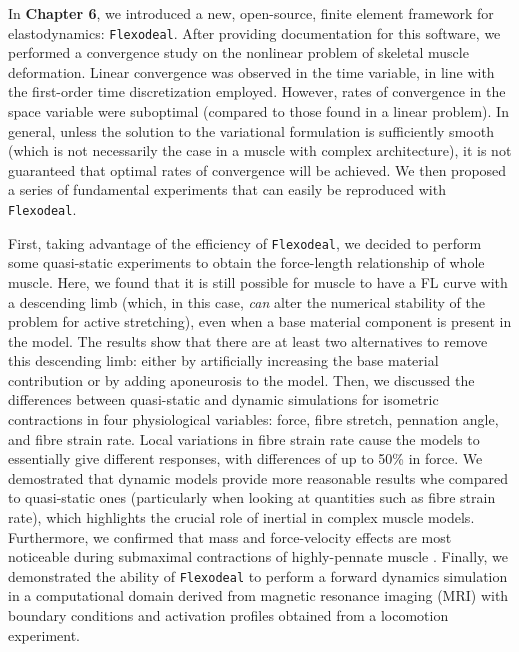 \documentclass{sfuthesis}
\numberwithin{equation}{section}
\numberwithin{figure}{chapter}
\numberwithin{table}{chapter}
\theoremstyle{definition}
\begin{document}
In \textbf{Chapter 6}, we introduced a new, open-source, finite element framework for elastodynamics: \texttt{Flexodeal}. After providing documentation for this software, we performed a convergence study on the nonlinear problem of skeletal muscle deformation. Linear convergence was observed in the time variable, in line with the first-order time discretization employed. However, rates of convergence in the space variable were suboptimal (compared to those found in a linear problem). In general, unless the solution to the variational formulation is sufficiently smooth (which is not necessarily the case in a muscle with complex architecture), it is not guaranteed that optimal rates of convergence will be achieved. We then proposed a series of fundamental experiments that can easily be reproduced with \texttt{Flexodeal}. 

First, taking advantage of the efficiency of \texttt{Flexodeal}, we decided to perform some quasi-static experiments to obtain the force-length relationship of whole muscle. Here, we found that it is still possible for muscle to have a FL curve with a descending limb (which, in this case, \textit{can} alter the numerical stability of the problem for active stretching), even when a base material component is present in the model. The results show that there are at least two alternatives to remove this descending limb: either by artificially increasing the base material contribution or by adding aponeurosis to the model.
Then, we discussed the differences between quasi-static and dynamic simulations for isometric contractions in four physiological variables: force, fibre stretch, pennation angle, and fibre strain rate. Local variations in fibre strain rate cause the models to essentially give different responses, with differences of up to 50\% in force. 
We demostrated that dynamic models provide more reasonable results whe compared to quasi-static ones (particularly when looking at quantities such as fibre strain rate), which highlights the crucial role of inertial in complex muscle models.
Furthermore, we confirmed that mass and force-velocity effects are most noticeable during submaximal contractions of highly-pennate muscle \cite{Paper1_WakelingEtAl2020}. 
Finally, we demonstrated the ability of \texttt{Flexodeal} to perform a forward dynamics simulation in a computational domain derived from magnetic resonance imaging (MRI) with boundary conditions and activation profiles obtained from a locomotion experiment.
\end{document}
